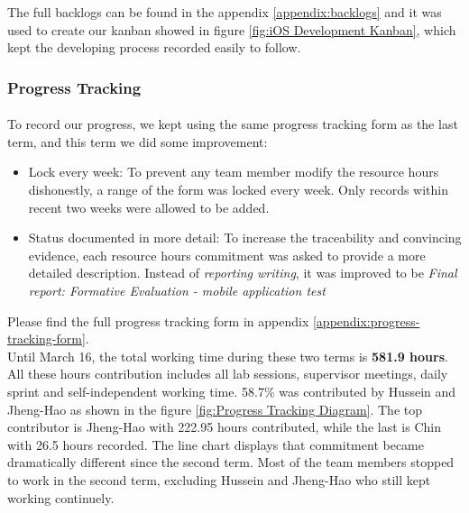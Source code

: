 \documentclass[12pt,a4paper]{article}
\begin{document}
          The full backlogs can be found in the appendix \ref{appendix:backlogs} and it was used to create our kanban showed in figure \ref{fig:iOS Development Kanban}, which kept the developing process recorded easily to follow.        
          
        \subsubsection{Progress Tracking}
          \paragraph{}To record our progress, we kept using the same progress tracking form as the last term, and this term we did some improvement:

          \begin{itemize}
            \item {Lock every week}: To prevent any team member modify the resource hours dishonestly, a range of the form was locked every week. Only records within recent two weeks were allowed to be added. 
            \item {Status documented in more detail}: To increase the traceability and convincing evidence, each resource hours commitment was asked to provide a more detailed description. Instead of {\it reporting writing}, it was improved to be {\it Final report: Formative Evaluation - mobile application test}
          \end{itemize}

          Please find the full progress tracking form in appendix \ref{appendix:progress-tracking-form}.\\
          
          Until March 16, the total working time during these two terms is {\bf 581.9 hours}. All these hours contribution includes all lab sessions, supervisor meetings, daily sprint and self-independent working time. 58.7\% was contributed by Hussein and Jheng-Hao as shown in the figure \ref{fig:Progress Tracking Diagram}. The top contributor is Jheng-Hao with 222.95 hours contributed, while the last is Chin with 26.5 hours recorded. The line chart displays that commitment became dramatically different since the second term. Most of the team members stopped to work in the second term, excluding Hussein and Jheng-Hao who still kept working continuely.
          
\end{document}
